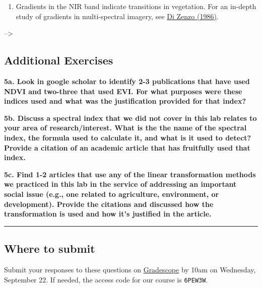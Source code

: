 \documentclass[
]{article}
\providecommand{\tightlist}{%
  \setlength{\itemsep}{0pt}\setlength{\parskip}{0pt}}
\begin{document}
\begin{enumerate}
\def\labelenumi{\roman{enumi}.}
\setcounter{enumi}{1}
\tightlist
\item
  Gradients in the NIR band indicate transitions in vegetation. For an in-depth study of gradients in multi-spectral imagery, see \href{http://www.sciencedirect.com/science/article/pii/0734189X86902239}{Di Zenzo (1986)}.
\end{enumerate}

--\textgreater{}

\hypertarget{additional-exercises-2}{%
\subsection{Additional Exercises}\label{additional-exercises-2}}

\textbf{5a. Look in google scholar to identify 2-3 publications that have used NDVI and two-three that used EVI. For what purposes were these indices used and what was the justification provided for that index? }

\textbf{5b. Discuss a spectral index that we did not cover in this lab relates to your area of research/interest. What is the the name of the spectral index, the formula used to calculate it, and what is it used to detect? Provide a citation of an academic article that has fruitfully used that index. }

\textbf{5c. Find 1-2 articles that use any of the linear transformation methods we practiced in this lab in the service of addressing an important social issue (e.g., one related to agriculture, environment, or development). Provide the citations and discussed how the transformation is used and how it's justified in the article. }

\begin{center}\rule{0.5\linewidth}{0.5pt}\end{center}

\hypertarget{where-to-submit-2}{%
\subsection*{Where to submit}\label{where-to-submit-2}}

Submit your responses to these questions on \href{https://www.gradescope.com/courses/293173/assignments/1446622/submissions}{Gradescope} by 10am on Wednesday, September 22. If needed, the access code for our course is \texttt{6PEW3W}.
\end{document}
